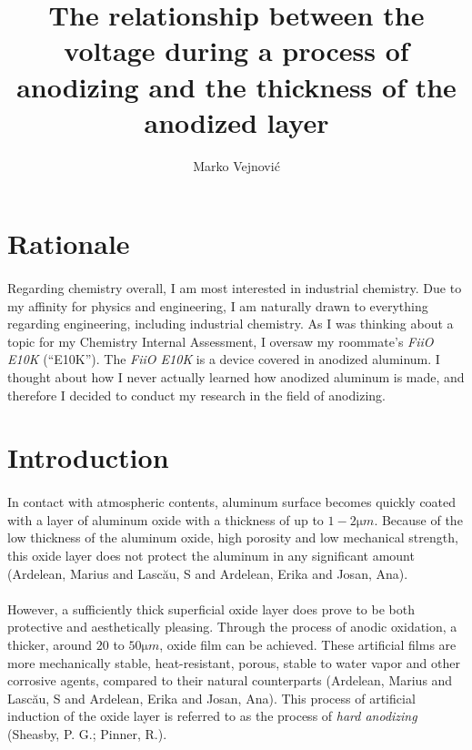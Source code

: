 \documentclass[a4paper]{article}
\begin{document}
\title{The relationship between the voltage during a process of anodizing and
the thickness of the anodized layer}
\author{Marko Vejnovi\'{c}}

\maketitle

\doublespacing

\section*{Rationale}
\paragraph*{}
Regarding chemistry overall, I am most interested in industrial chemistry. Due
to my affinity for physics and engineering, I am naturally drawn to everything
regarding engineering, including industrial chemistry. As I was thinking about
a topic for my Chemistry Internal Assessment, I oversaw my roommate's
\textit{FiiO E10K} (``E10K''). The \textit{FiiO E10K} is a device covered in
anodized aluminum. I thought about how I never actually learned how anodized
aluminum is made, and therefore I decided to conduct my research in the field
of anodizing.

\section{Introduction}
\paragraph*{}
In contact with atmospheric contents, aluminum surface becomes quickly coated
with a layer of aluminum oxide with a thickness of up to $1-2\si{\micro
m}$. Because of the low thickness of the aluminum oxide, high porosity and low
mechanical strength, this oxide layer does not protect the aluminum in any
significant amount (Ardelean, Marius and Lascău, S and Ardelean, Erika and
Josan, Ana).

\paragraph*{}
However, a sufficiently thick superficial oxide layer does prove to be both
protective and aesthetically pleasing. Through the process of anodic oxidation,
a thicker, around $20$ to $50\si{\micro m}$, oxide film can be achieved. These
artificial films are more mechanically stable, heat-resistant, porous, stable
to water vapor and other corrosive agents, compared to their natural
counterparts (Ardelean, Marius and Lascău, S and Ardelean, Erika and Josan,
Ana). This process of artificial induction of the oxide layer is referred to as
the process of \textit{hard anodizing} (Sheasby, P. G.; Pinner, R.).
\end{document}
